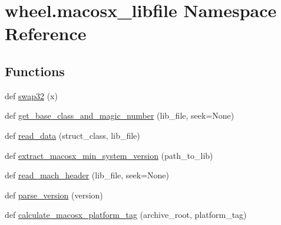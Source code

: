 \hypertarget{namespacewheel_1_1macosx__libfile}{}\section{wheel.\+macosx\+\_\+libfile Namespace Reference}
\label{namespacewheel_1_1macosx__libfile}
\subsection*{Functions}
\begin{DoxyCompactItemize}
\item 
def \hyperlink{namespacewheel_1_1macosx__libfile_a7e266d63eddced13840dc7187c7b4a0c}{swap32} (x)
\item 
def \hyperlink{namespacewheel_1_1macosx__libfile_a558140e8275726186090473cca428d7d}{get\+\_\+base\+\_\+class\+\_\+and\+\_\+magic\+\_\+number} (lib\+\_\+file, seek=None)
\item 
def \hyperlink{namespacewheel_1_1macosx__libfile_a8289d6e5cf9a06c014ae5091f64cafea}{read\+\_\+data} (struct\+\_\+class, lib\+\_\+file)
\item 
def \hyperlink{namespacewheel_1_1macosx__libfile_a170e93b2ff4578e532d3863325e0c138}{extract\+\_\+macosx\+\_\+min\+\_\+system\+\_\+version} (path\+\_\+to\+\_\+lib)
\item 
def \hyperlink{namespacewheel_1_1macosx__libfile_a81a1c24ff2678ffe61fa52733812b894}{read\+\_\+mach\+\_\+header} (lib\+\_\+file, seek=None)
\item 
def \hyperlink{namespacewheel_1_1macosx__libfile_abdfb08851e34b7e57d43dc01addf40ce}{parse\+\_\+version} (version)
\item 
def \hyperlink{namespacewheel_1_1macosx__libfile_af3877aa7396b5d34ed3f151aeb08c6f7}{calculate\+\_\+macosx\+\_\+platform\+\_\+tag} (archive\+\_\+root, platform\+\_\+tag)
\end{DoxyCompactItemize}
